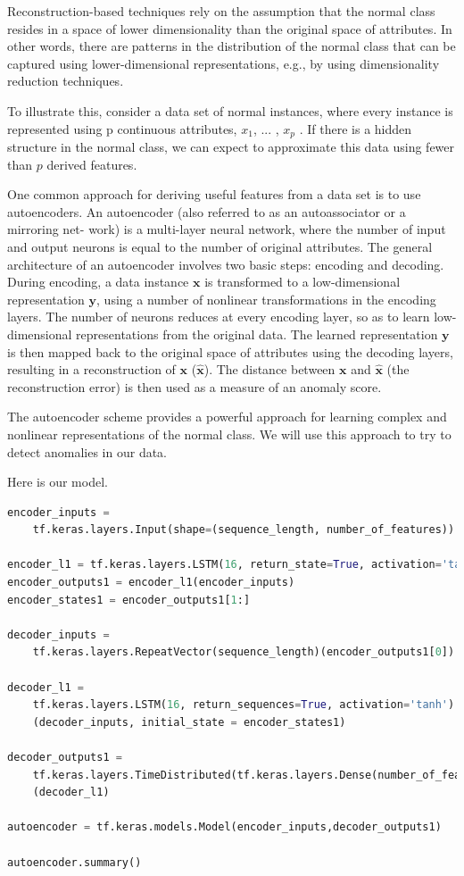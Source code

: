 Reconstruction-based techniques rely on the assumption that the normal class resides in a space of lower dimensionality than the original space of attributes.
In other words, there are patterns in the distribution of the normal class that can be captured using lower-dimensional representations, e.g., by using dimensionality reduction techniques.

To illustrate this, consider a data set of normal instances, where every instance is represented using p continuous attributes, $x_1$, ... , $x_p$ . If there is
a hidden structure in the normal class, we can expect to approximate this data using fewer than $p$ derived features.

One common approach for deriving useful features from a data set is to use autoencoders. An autoencoder (also referred to as an autoassociator or a mirroring net-
work) is a multi-layer neural network, where the number of input and output neurons is equal to the number of original attributes. The general architecture of an autoencoder involves two basic steps: encoding and decoding. During encoding, a data instance $\textbf{x}$ is transformed to a low-dimensional representation $\textbf{y}$, using a number of nonlinear transformations in the encoding layers. The number of neurons reduces at every encoding layer, so as to learn low-dimensional representations from the original data. The learned representation $\textbf{y}$ is then mapped back to the original space of attributes using the decoding layers, resulting in a reconstruction of $\textbf{x}$ ($\hat {\textbf{x}}$). The distance between $\textbf{x}$ and $\hat {\textbf{x}}$ (the reconstruction error) is then used as a measure of an anomaly score.

The autoencoder scheme provides a powerful approach for learning complex and nonlinear representations of the normal class. We will use this approach to try to detect anomalies in our data.

Here is our model.

\begin{lstlisting}[language=Python]
encoder_inputs = 
	tf.keras.layers.Input(shape=(sequence_length, number_of_features))

encoder_l1 = tf.keras.layers.LSTM(16, return_state=True, activation='tanh')
encoder_outputs1 = encoder_l1(encoder_inputs)
encoder_states1 = encoder_outputs1[1:]

decoder_inputs = 
	tf.keras.layers.RepeatVector(sequence_length)(encoder_outputs1[0])

decoder_l1 = 
	tf.keras.layers.LSTM(16, return_sequences=True, activation='tanh')
	(decoder_inputs, initial_state = encoder_states1)

decoder_outputs1 = 
	tf.keras.layers.TimeDistributed(tf.keras.layers.Dense(number_of_features))
	(decoder_l1)

autoencoder = tf.keras.models.Model(encoder_inputs,decoder_outputs1)

autoencoder.summary()
\end{lstlisting}

